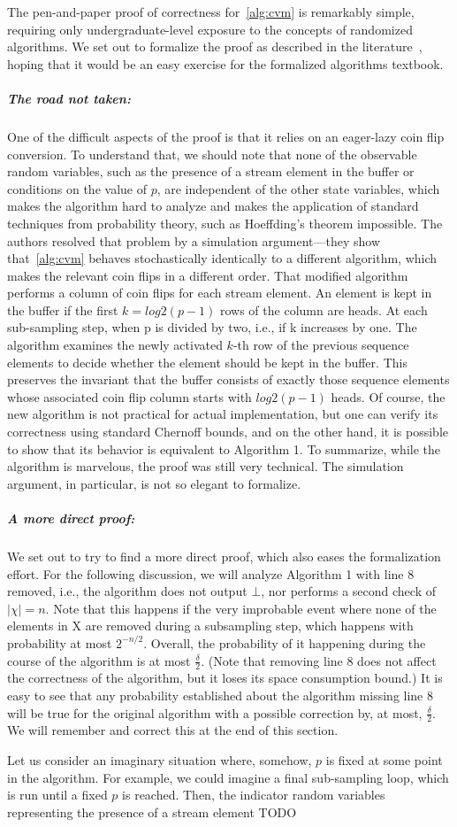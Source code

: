 The pen-and-paper proof of correctness for~\cref{alg:cvm} is remarkably simple, requiring only undergraduate-level exposure to the concepts of randomized algorithms.
We set out to formalize the proof as described in the literature~\cite{DBLP:conf/esa/0001VM22}, hoping that it would be an easy exercise for the formalized algorithms textbook.

\subparagraph*{The road not taken:}
One of the difficult aspects of the proof is that it relies on an eager-lazy coin flip conversion.
To understand that, we should note that none of the observable random variables, such as the presence of a stream element in the buffer or conditions on the value of $p$, are independent of the other state variables, which makes the algorithm hard to analyze and makes the application of standard techniques from probability theory, such as Hoeffding's theorem impossible.
The authors resolved that problem by a simulation argument---they show that~\cref{alg:cvm} behaves stochastically identically to a different algorithm, which makes the relevant coin flips in a different order.
That modified algorithm performs a column of coin flips for each stream element.
An element is kept in the buffer if the first $k=log2(p-1)$ rows of the column are heads.
At each sub-sampling step, when p is divided by two, i.e., if k increases by one.
The algorithm examines the newly activated $k$-th row of the previous sequence elements to decide whether the element should be kept in the buffer.
This preserves the invariant that the buffer consists of exactly those sequence elements whose associated coin flip column starts with $log2(p-1)$ heads.
Of course, the new algorithm is not practical for actual implementation, but one can verify its correctness using standard Chernoff bounds, and on the other hand, it is possible to show that its behavior is equivalent to Algorithm 1.
To summarize, while the algorithm is marvelous, the proof was still very technical.
The simulation argument, in particular, is not so elegant to formalize.

\subparagraph*{A more direct proof:}
We set out to try to find a more direct proof, which also eases the formalization effort.
For the following discussion, we will analyze Algorithm 1 with line 8 removed, i.e., the algorithm does not output $\bot$, nor performs a second check of $|\chi|=n$.
Note that this happens if the very improbable event where none of the elements in X are removed during a subsampling step, which happens with probability at most $2^{-n/2}$.
Overall, the probability of it happening during the course of the algorithm is at most $\frac{\delta}{2}$. (Note that removing line 8 does not affect the correctness of the algorithm, but it loses its space consumption bound.)
It is easy to see that any probability established about the algorithm missing line 8 will be true for the original algorithm with a possible correction by, at most,  $\frac{\delta}{2}$.
We will remember and correct this at the end of this section.

Let us consider an imaginary situation where, somehow, $p$ is fixed at some point in the algorithm.
For example, we could imagine a final sub-sampling loop, which is run until a fixed $p$ is reached.
Then, the indicator random variables representing the presence of a stream element TODO
